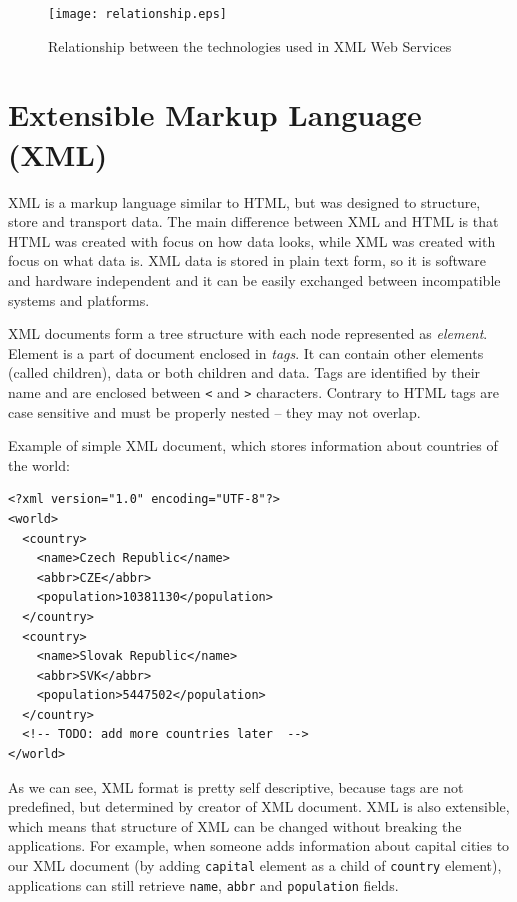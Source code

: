 \documentclass[12pt,notitlepage]{report}
\begin{document}
\begin{figure}[htb]
 \begin{center}
  \texttt{[image: relationship.eps]}
 \end{center}
 \caption{Relationship between the technologies used in XML Web Services}
 \label{relationship}
\end{figure}

\section{Extensible Markup Language (XML)}
\label{section-xml}
XML\cite{w3c-xml} is a markup language similar to HTML, but was designed to structure, store and transport data. The main difference between XML and HTML is that HTML was created with focus on how data looks, while XML was created with focus on what data is. XML data is stored in plain text form, so it is software and hardware independent and it can be easily exchanged between incompatible systems and platforms. 

XML documents form a tree structure with each node represented as \textit{element}. Element is a part of document enclosed in \textit{tags}. It can contain other elements (called children), data or both children and data. Tags are identified by their name and are enclosed between \texttt{<} and \texttt{>} characters. Contrary to HTML tags are case sensitive and must be properly nested -- they may not overlap.

Example of simple XML document, which stores information about countries of the world:

\begin{small}
\begin{verbatim}
<?xml version="1.0" encoding="UTF-8"?>
<world>
  <country>
    <name>Czech Republic</name>
    <abbr>CZE</abbr>
    <population>10381130</population>
  </country>
  <country>
    <name>Slovak Republic</name>
    <abbr>SVK</abbr>
    <population>5447502</population>
  </country>
  <!-- TODO: add more countries later  -->
</world>
\end{verbatim}
\end{small}

As we can see, XML format is pretty self descriptive, because tags are not predefined, but determined by creator of XML document. XML is also extensible, which means that structure of XML can be changed without breaking the applications. For example, when someone adds information about capital cities to our XML document (by adding \texttt{capital} element as a child of \texttt{country} element), applications can still retrieve \texttt{name}, \texttt{abbr} and \texttt{population} fields.
\end{document}
